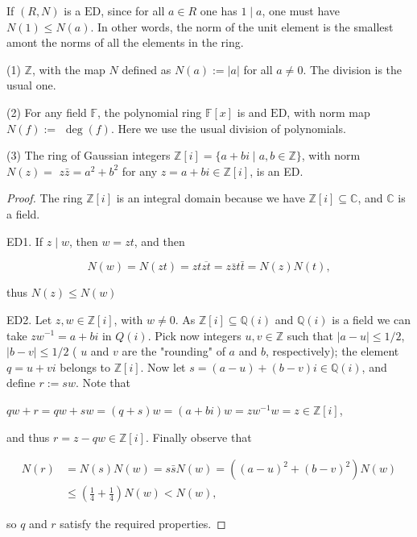 \begin{example}
    If $(R, N)$ is a $\mathrm{ED}$, since for all $a \in R$ one has $1 \mid a$, one must have $N(1) \leq N(a)$. In other words, the norm of the unit element is the smallest amont the norms of all the elements in the ring.
\end{example} 

\begin{example}
    (1) $\mathbb{Z}$, with the map $N$ defined as $N(a):=|a|$ for all $a \neq 0$. The division is the usual one.

    (2) For any field $\mathbb{F}$, the polynomial ring $\mathbb{F}[x]$ is and $\mathrm{ED}$, with norm map $N(f):=$ $\operatorname{deg}(f)$. Here we use the usual division of polynomials.
    
    (3) The ring of Gaussian integers $\mathbb{Z}[i]=\{a+b i \mid a, b \in \mathbb{Z}\}$, with norm $N(z)=$ $z \bar{z}=a^{2}+b^{2}$ for any $z=a+b i \in \mathbb{Z}[i]$, is an ED.
\end{example}
\begin{proof}
    The ring $\mathbb{Z}[i]$ is an integral domain because we have $\mathbb{Z}[i] \subseteq \mathbb{C}$, and $\mathbb{C}$ is a field.

ED1. If $z \mid w$, then $w=z t$, and then

$$
N(w)=N(z t)=z t \overline{z t}=z \bar{z} t \bar{t}=N(z) N(t),
$$

thus $N(z) \leq N(w)$

ED2. Let $z, w \in \mathbb{Z}[i]$, with $w \neq 0$. As $\mathbb{Z}[i] \subseteq \mathbb{Q}(i)$ and $\mathbb{Q}(i)$ is a field we can take $z w^{-1}=a+b i$ in $Q(i)$. Pick now integers $u, v \in \mathbb{Z}$ such that $|a-u| \leq 1 / 2$, $|b-v| \leq 1 / 2$ ( $u$ and $v$ are the "rounding" of $a$ and $b$, respectively); the element $q=u+v i$ belongs to $\mathbb{Z}[i]$. Now let $s=(a-u)+(b-v) i \in \mathbb{Q}(i)$, and define $r:=s w$. Note that

$q w+r=q w+s w=(q+s) w=(a+b i) w=z w^{-1} w=z \in \mathbb{Z}[i]$,

and thus $r=z-q w \in \mathbb{Z}[i]$. Finally observe that

$$
\begin{aligned}
N(r) & =N(s) N(w)=s \bar{s} N(w)=\left((a-u)^{2}+(b-v)^{2}\right) N(w) \\
& \leq\left(\frac{1}{4}+\frac{1}{4}\right) N(w)<N(w),
\end{aligned}
$$

so $q$ and $r$ satisfy the required properties.
\end{proof}

